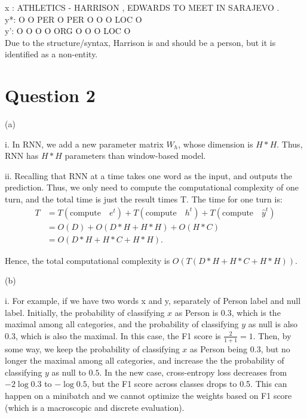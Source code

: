 \documentclass{article}
\theoremstyle{definition}
\theoremstyle{remark}
\numberwithin{equation}{section}
\begin{document}
x : ATHLETICS - HARRISON , EDWARDS TO MEET IN SARAJEVO . \\
y*: O         O PER      O PER     O  O    O  LOC      O   \\
y': O         O O        O ORG     O  O    O  LOC      O   \\

Due to the structure/syntax, Harrison is and should be a person, but it is identified as a non-entity. 


\newpage

\section*{Question 2}

(a) 

i. In RNN, we add a new parameter matrix $W_h$, whose dimension is $H * H$. Thus, RNN has $H * H$ parameters than window-based model.

\vspace{10pt}

ii. Recalling that RNN at a time takes one word as the input, and outputs the prediction. Thus, we only need to compute the computational complexity of one turn, and the total time is just the result times T. The time for one turn is:
 \begin{align*}
 T &=  T(\text{compute} \quad e^{t})  + T(\text{compute}  \quad h^{t}) +  T(\text{compute}  \quad  \hat{y}^{t}) \\
    &= O(D) + O( D * H + H * H)  +  O(H*C) \\
    &= O ( D * H + H *C + H * H ).
 \end{align*}
 
 
Hence, the total computational complexity is $O ( T  (D * H + H *C + H * H) )$.

\newpage

(b) 

i. For example, if we have two words x and y, separately of Person label and null label. Initially, the probability of classifying $x$ as Person is $0.3$, which is the maximal among all categories, and the probability of classifying $y$ as null is also $0.3$, which is also the maximal. In this case, the F1 score is $\frac{2}{1 + 1} = 1$. Then, by some way, we keep the probability of classifying $x$ as Person being $0.3$, but no longer the maximal among all categories, and increase the the probability of classifying $y$ as null to $0.5$. In the new case, cross-entropy loss decreases from $-2\log0.3$ to $-\log0.5$, but the F1 score across classes drops to 0.5. This can happen on a minibatch and we cannot optimize the weights based on F1 score (which is a macroscopic and discrete evaluation).
\end{document}
